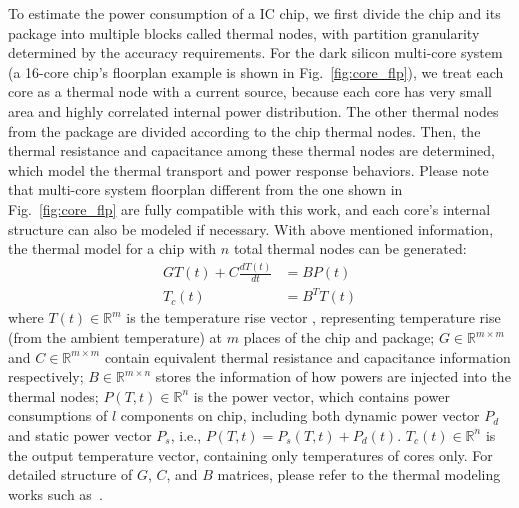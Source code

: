 To estimate the power consumption of a IC chip, we first divide the chip and its package into multiple blocks called thermal nodes, with partition granularity determined by the accuracy requirements. For the dark silicon multi-core system (a 16-core chip's floorplan example is shown in Fig.~\ref{fig:core_flp}), we treat each core as a thermal node with a current source, because each core has very small area and highly correlated internal power distribution. The other thermal nodes from the package are divided according to the chip thermal nodes. Then, the thermal resistance and capacitance among these thermal nodes are determined, which model the thermal transport and power response behaviors. Please note that multi-core system floorplan different from the one shown in Fig.~\ref{fig:core_flp} are fully compatible with this work, and each core's internal structure can also be modeled if necessary. With above mentioned information, the thermal model for a chip with $n$ total thermal nodes can be generated:
\begin{equation}\label{eq:therm_model}
\begin{split}
GT(t) + C\frac{dT(t)}{dt} &= BP(t)\\
T_{c}(t) &= B^{T}T(t)
\end{split}
\end{equation}
where $T(t) \in \mathbb{R}^m$ is the temperature rise vector , representing temperature rise (from the ambient temperature) at $m$ places of the chip and package; $G \in \mathbb{R}^{m\times m}$ and  $C \in \mathbb{R}^{m \times m}$ contain equivalent thermal resistance and capacitance information respectively; $B \in \mathbb{R}^{m \times n}$ stores the information of how powers are injected into the thermal nodes; $P(T, t) \in \mathbb{R}^{n}$ is the power vector, which contains power consumptions of $l$ components on chip, including both dynamic power vector $P_d$ and static power vector $P_s$, i.e., $P(T, t)=P_s(T, t)+P_d(t)$. $T_{c}(t) \in \mathbb{R}^n$ is the output temperature vector, containing only temperatures of cores only. For detailed structure of $G$, $C$, and $B$ matrices, please refer to the thermal modeling works such as~\cite{Huang:TVLSI'06,Huang:TC'08,WangTan:TODAES'13,Hanumaiah:TCAD'11}.